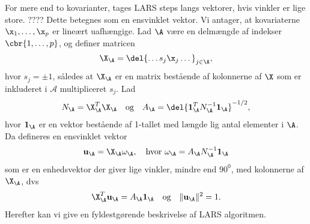 For mere end to kovarianter, tages LARS steps langs vektorer, hvis vinkler er lige store. ???? Dette betegnes som en ensvinklet vektor.
Vi antager, at kovariaterne \(\x_1, \ldots, \x_p\) er lineært uafhængige.
Lad \(\A\) være en delmængde af indekser \(\cbr{1,\ldots, p}\), og definer matricen
\begin{align}
\X_\A = \del{\dots s_j \x_j \dots}_{j \in \A}, \label{eq:lars_2.4}
\end{align}
hvor  $s_j = \pm 1$, således at \(\X_\A\) er en matrix bestående af kolonnerne af \(\X\) som er inkluderet i \(\mathcal{A}\) multipliceret \(s_j\).
Lad 
\begin{align}
N_\A = \X_\A^T \X_\A \quad \text{og} \quad A_\A = \del{\mathbf{1}_\A^T N_\A^{-1} \mathbf{1}_\A}^{-1/2}, \label{eq:lars_2.5}
\end{align}
hvor \(\mathbf{1}_\A\) er en vektor bestående af 1-tallet med længde lig antal elementer i \(\A\).
Da defineres en ensvinklet vektor
\begin{align}
\mathbf{u}_\A = \X_\A \omega_\A, \quad \text{hvor } \omega_\A = A_\A N_\A^{-1} \mathbf{1}_\A \label{eq:lars_2.6}
\end{align}
som er en enhedsvektor der giver lige vinkler, mindre end \(90^0\), med kolonnerne af \(\X_\A\), dvs
\begin{align}
\X_\A^T \mathbf{u}_\A = A_\A \mathbf{1}_\A \quad \text{og} \quad \Vert \mathbf{u}_\A \Vert^2 = 1. \label{eq:lars_2.7}
\end{align}
Herefter kan vi give en fyldestgørende beskrivelse af LARS algoritmen.
%
